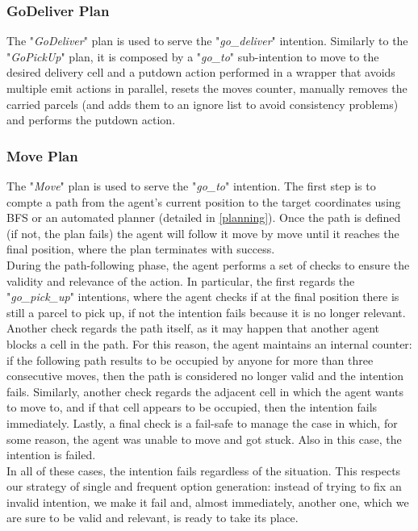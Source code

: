         \subsubsection{GoDeliver Plan}
            The "\textit{GoDeliver}" plan is used to serve the "\textit{go\_deliver}" intention. Similarly to the "\textit{GoPickUp}" plan, it is composed by a "\textit{go\_to}" sub-intention to move to the desired delivery cell and a putdown action performed in a wrapper that avoids multiple emit actions in parallel, resets the moves counter, manually removes the carried parcels (and adds them to an ignore list to avoid consistency problems) and performs the putdown action. 

        \subsubsection{Move Plan}
            The "\textit{Move}" plan is used to serve the "\textit{go\_to}" intention. The first step is to compte a path from the agent's current position to the target coordinates using BFS or an automated planner (detailed in \ref{planning}). Once the path is defined (if not, the plan fails) the agent will follow it move by move until it reaches the final position, where the plan terminates with success.
            \medskip\\
            During the path-following phase, the agent performs a set of checks to ensure the validity and relevance of the action. In particular, the first regards the "\textit{go\_pick\_up}" intentions, where the agent checks if at the final position there is still a parcel to pick up, if not the intention fails because it is no longer relevant. Another check regards the path itself, as it may happen that another agent blocks a cell in the path. For this reason, the agent maintains an internal counter: if the following path results to be occupied by anyone for more than three consecutive moves, then the path is considered no longer valid and the intention fails. Similarly, another check regards the adjacent cell in which the agent wants to move to, and if that cell appears to be occupied, then the intention fails immediately. Lastly, a final check is a fail-safe to manage the case in which, for some reason, the agent was unable to move and got stuck. Also in this case, the intention is failed.
            \medskip\\
            In all of these cases, the intention fails regardless of the situation. This respects our strategy of single and frequent option generation: instead of trying to fix an invalid intention, we make it fail and, almost immediately, another one, which we are sure to be valid and relevant, is ready to take its place.

